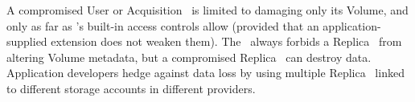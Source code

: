 A compromised User or Acquisition \SG\ is limited to damaging only its
Volume, and only as far as \Syndicate's built-in access controls allow
(provided that an application-supplied extension does not weaken them).  The
\MS\ always forbids a Replica \SGs\ from altering Volume metadata, but
a compromised Replica \SG\ can destroy data.  Application developers
hedge against data loss by using multiple Replica \SGs\ linked to
different storage accounts in different providers.

